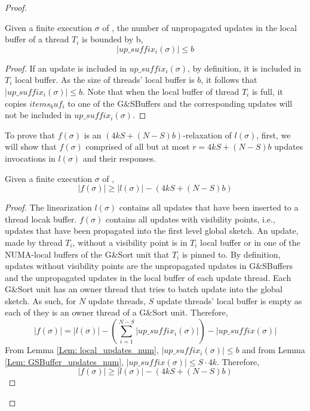\begin{proof}
\begin{lemma}\label{Lem: local_updates_num}
Given a finite execution $\sigma$ of \mysketch, the number of unpropagated updates in the local buffer of a thread \(T_i\) is bounded by b, \[|\mathit{up\_suffix_i}(\sigma)| \leq b\]
\end{lemma}
\begin{proof}
If an update is included in \(\mathit{up\_suffix_i}(\sigma)\), by definition, it is included in $T_i$ local buffer. 
As the size of threads' local buffer is $b$, it follows that $|\mathit{up\_suffix_i}(\sigma)| \leq b$. 
Note that when the local buffer of thread \(T_i\) is full, it copies \(items_buf_i\) to one of the G\&SBuffers and the corresponding updates will not be included in \(up\_suffix_i(\sigma)\).
\end{proof}

To prove that $f(\sigma)$ is an \((4kS + (N-S)b)\)-relaxation of $l(\sigma)$, first, we will show that $f(\sigma)$ comprised of all but at most \(r=4kS + (N-S)b\) updates invocations in $l(\sigma)$ and their responses.

\begin{lemma} \label{Lem: invocations_bound}
Given a finite execution $\sigma$ of \mysketch, \[ |f(\sigma)| \ge |l(\sigma)| - (4kS + (N-S)b) \]
\end{lemma}
\begin{proof}
The linearization $l(\sigma)$ contains all updates that have been inserted to a thread locak buffer. $f(\sigma)$ contains all updates with visibility points, i.e., updates that have been propagated into the first level global sketch. 
An update, made by thread $T_i$, without a visibility point is in $T_i$ local buffer or in one of the NUMA-local buffers of the G\&Sort unit that $T_i$ is pinned to. By definition, updates without visibility points are the unpropagated updates in G\&SBuffers and the unpropagated updates in the local buffer of each update thread. Each G\&Sort unit has an owner thread that tries to batch update into the global sketch. As such, for \(N\) update threads, $S$ update threads' local buffer is empty as each of they is an owner thread of a G\&Sort unit. Therefore,
\begin{equation}
    |f(\sigma)| = |l(\sigma)| - \left(\sum_{i=1}^{N-S}|\mathit{up\_suffix_i}(\sigma)|\right) - |\mathit{up\_suffix}(\sigma)|
\end{equation}
From Lemma \ref{Lem: local_updates_num}, \(|\mathit{up\_suffix_i}(\sigma)| \leq b\) and from Lemma \ref{Lem: GSBuffer_updates_num}, \(|\mathit{up\_suffix}(\sigma)| \leq S \cdot 4k\). Therefore,
\begin{equation}
    |f(\sigma)| \ge |l(\sigma)| - (4kS + (N-S)b)
\end{equation}


\end{proof}
\end{proof}
